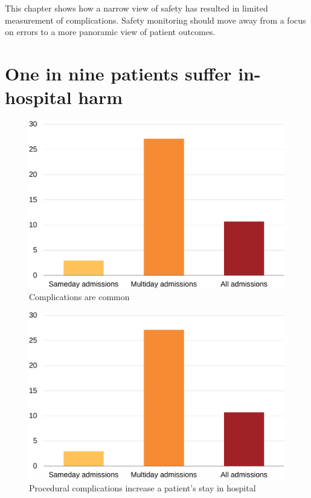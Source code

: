 \documentclass[FrontPage]{grattan}
\begin{document}
This chapter shows how a narrow view of safety has resulted in limited measurement of complications.
Safety monitoring should move away from a focus on errors to a more panoramic view of patient outcomes.

\section{One in nine patients suffer in-hospital harm}\label{sec:one-in-nine-patients-suffer-in-hospital-harm}

\begin{figure}[!t]
\caption{Complications are common}\label{fig:1-1-complications-are-common}
\includegraphics[page=1]{atlas/comps_charts.pdf}
\end{figure}

\begin{figure}[!t]
\caption{Procedural complications increase a patient's stay in hospital}\label{fig:1-2-avg-risk-adjusted-len-of-stay-for-patients-with-without-procedural-complications}
\includegraphics[page=18]{atlas/comps_charts.pdf}
\end{figure}
\end{document}
